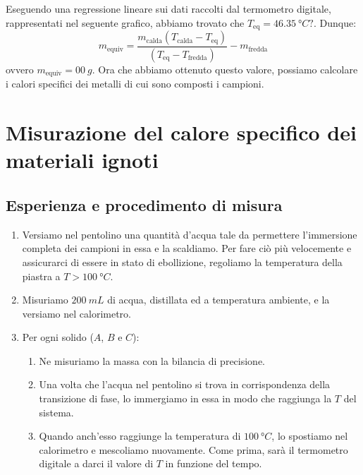 \documentclass{article}
\begin{document}
Eseguendo una regressione lineare sui dati raccolti dal termometro digitale, rappresentati nel    %
seguente grafico, abbiamo trovato che $T_\text{eq} = \qty{46,35}{\degree C}?$. Dunque:    %
    \[
        m_\text{equiv} = \frac{m_\text{calda} (T_\text{calda}-T_\text{eq})}{(T_\text{eq}-T_\text{fredda})} - m_\text{fredda}
    \]
ovvero $m_\text{equiv} = \qty{00}{g}$. Ora che abbiamo ottenuto questo valore, possiamo calcolare    %
i calori specifici dei metalli di cui sono composti i campioni.



\section{Misurazione del calore specifico dei materiali ignoti}
    
\subsection{Esperienza e procedimento di misura}

\begin{enumerate}
    \item
        Versiamo nel pentolino una quantità d'acqua tale da permettere l'immersione
        completa dei campioni in essa e la scaldiamo. Per fare ciò più velocemente
        e assicurarci di essere in stato di ebollizione, regoliamo la temperatura
        della piastra a $T>\qty{100}{\degree C}$.
    \item
        Misuriamo $\qty{200}{mL}$ di acqua, distillata ed a temperatura ambiente,
        e la versiamo nel calorimetro.
    \item
        Per ogni solido ($A$, $B$ e $C$):
    \begin{enumerate}
        \item
            Ne misuriamo la massa con la bilancia di precisione.
        \item
            Una volta che l'acqua nel pentolino si trova in corrispondenza della
            transizione di fase, lo immergiamo in essa in modo che raggiunga la
            $T$ del sistema.
        \item
            Quando anch'esso raggiunge la temperatura di $\qty{100}{\degree C}$,
            lo spostiamo nel calorimetro e mescoliamo nuovamente. Come prima, sarà
            il termometro digitale a darci il valore di $T$ in funzione del tempo.
    \end{enumerate}
\end{enumerate}
\end{document}
